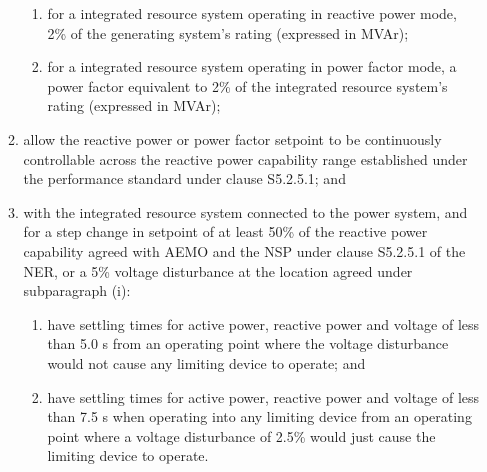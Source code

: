 \begin{enumerate}
\begin{enumerate}
\begin{enumerate}
			\item for a integrated resource system operating in reactive power mode, 2\% of the generating system’s rating (expressed in MVAr);   
			\item for a integrated resource system operating in power factor mode, a power factor equivalent to 2\% of the integrated resource system's rating (expressed in MVAr); 
		\end{enumerate}
		\item allow the reactive power or power factor setpoint to be continuously controllable across the reactive power capability range established under the performance standard under clause S5.2.5.1; and 
		\item with the integrated resource system connected to the power system, and for a step change in setpoint of at least 50\% of the reactive power capability agreed with AEMO and the NSP under clause S5.2.5.1 of the NER, or a 5\% voltage disturbance at the location agreed under subparagraph (i):
		\begin{enumerate}
			\item have settling times for active power, reactive power and voltage of less than 5.0 s from an operating point where the voltage disturbance would not cause any limiting device to operate; and 
			\item have settling times for active power, reactive power and voltage of less than 7.5 s when operating into any limiting device from an operating point where a voltage disturbance of 2.5\% would just cause the limiting device to operate. 
		\end{enumerate}
	\end{enumerate}
\end{enumerate}
